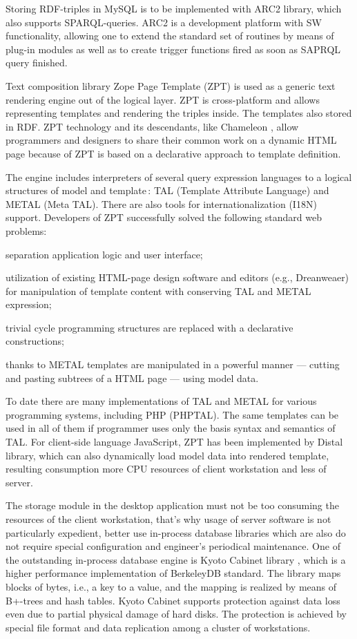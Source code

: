 \documentclass[conference]{IEEEtran}
\begin{document}
Storing RDF-triples in MySQL is to be implemented with ARC2 library,
which also supports SPARQL-queries.  ARC2 is a development platform
with SW functionality, allowing one to extend the standard set of
routines by means of plug-in modules as well as to create trigger
functions fired as soon as SAPRQL query finished.

Text composition library Zope Page Template (ZPT) is used as a generic
text rendering engine out of the logical layer.  ZPT is cross-platform
and allows representing templates and rendering the triples inside.
The templates also stored in RDF.  ZPT technology and its descendants,
like Chameleon \cite{cham}, allow programmers and designers to share their common
work on a dynamic HTML page because of ZPT is based on a declarative
approach to template definition.

The engine includes interpreters of several query expression languages
to a logical structures of model and template\,: TAL (Template Attribute
Language) and METAL (Meta TAL).  There are also tools for
internationalization (I18N) support.  Developers of ZPT successfully
solved the following standard web problems:
\begin{IEEEitemize}
\item separation application logic and user interface;
\item utilization of existing HTML-page design software and editors
  (e.g., Dreanweaer) for manipulation of template content with
  conserving TAL and METAL expression;
\item trivial cycle programming structures are replaced with a
  declarative constructions;
\item thanks to METAL templates are manipulated in a powerful manner
  --- cutting and pasting subtrees of a HTML page --- using model data.
\end{IEEEitemize}

To date there are many implementations of TAL and METAL for various
programming systems, including PHP (PHPTAL).  The same templates can
be used in all of them if programmer uses only the basis syntax and
semantics of TAL.  For client-side language JavaScript, ZPT has been
implemented by Distal library, which can also dynamically load model
data into rendered template, resulting consumption more CPU resources
of client workstation and less of server.

The storage module in the desktop application must not be too
consuming the resources of the client workstation, that's why usage of
server software is not particularly expedient, better use in-process
database libraries which are also do not require special configuration
and engineer's periodical maintenance.  One of the outstanding
in-process database engine is Kyoto Cabinet library \cite{kyoto},
which is a higher performance implementation of BerkeleyDB standard.
The library maps blocks of bytes, i.e., a key to a value, and the
mapping is realized by means of B+-trees and hash tables.  Kyoto
Cabinet supports protection against data loss even due to partial
physical damage of hard disks.  The protection is achieved by special
file format and data replication among a cluster of workstations.
\end{document}
